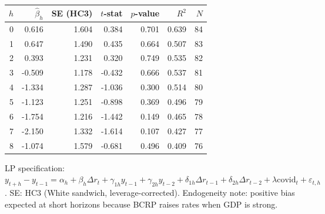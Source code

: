 
\begin{tabular}{rrrrrrr}
\toprule
$h$ & $\hat{\beta}_h$ & SE (HC3) & $t$-stat & $p$-value & $R^2$ & $N$ \\
\midrule
    0 & 0.616 & 1.604 & 0.384 & 0.701 & 0.639 & 84 \\
    1 & 0.647 & 1.490 & 0.435 & 0.664 & 0.507 & 83 \\
    2 & 0.393 & 1.231 & 0.320 & 0.749 & 0.535 & 82 \\
    3 & -0.509 & 1.178 & -0.432 & 0.666 & 0.537 & 81 \\
    4 & -1.334 & 1.287 & -1.036 & 0.300 & 0.514 & 80 \\
    5 & -1.123 & 1.251 & -0.898 & 0.369 & 0.496 & 79 \\
    6 & -1.754 & 1.216 & -1.442 & 0.149 & 0.465 & 78 \\
    7 & -2.150 & 1.332 & -1.614 & 0.107 & 0.427 & 77 \\
    8 & -1.074 & 1.579 & -0.681 & 0.496 & 0.409 & 76 \\
\bottomrule
\end{tabular}
\begin{tablenotes}
\small LP specification: $y_{t+h}-y_{t-1}=\alpha_h + \beta_h \Delta r_t
+ \gamma_{1h} y_{t-1} + \gamma_{2h} y_{t-2}
+ \delta_{1h} \Delta r_{t-1} + \delta_{2h} \Delta r_{t-2}
+ \lambda \text{covid}_t + \varepsilon_{t,h}$.
SE: HC3 (White sandwich, leverage-corrected). Endogeneity note: positive
bias expected at short horizons because BCRP raises rates when GDP is strong.
\end{tablenotes}
